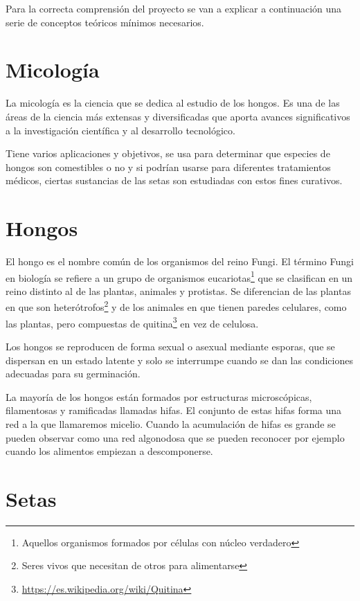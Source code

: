 
Para la correcta comprensión del proyecto se van a explicar a continuación una serie de conceptos teóricos mínimos necesarios.

\section{Micología}

La micología es la ciencia que se dedica al estudio de los hongos. Es una de las áreas de la ciencia más extensas y diversificadas que aporta avances significativos a la investigación científica y al desarrollo tecnológico. ~\cite{wiki:micologia}

Tiene varios aplicaciones y objetivos, se usa para determinar que especies de hongos son comestibles o no y si podrían usarse para diferentes tratamientos médicos, ciertas sustancias de las setas son estudiadas con estos fines curativos. \cite{micologiaDef}

\section{Hongos}

El hongo es el nombre común de los organismos del reino Fungi. El término Fungi en biología se refiere a un grupo de organismos eucariotas\footnote{Aquellos organismos formados por células con núcleo verdadero} que se clasifican en un reino distinto al de las plantas, animales y protistas. Se diferencian de las plantas en que son heterótrofos\footnote{Seres vivos que necesitan de otros para alimentarse} y de los animales en que tienen paredes celulares, como las plantas, pero compuestas de quitina\footnote{\url{https://es.wikipedia.org/wiki/Quitina}} en vez de celulosa.

Los hongos se reproducen de forma sexual o asexual mediante esporas, que se dispersan en un estado latente y solo se interrumpe cuando se dan las condiciones adecuadas para su germinación. ~\cite{wiki:fungi}

La mayoría de los hongos están formados por estructuras microscópicas, filamentosas y ramificadas llamadas hifas. El conjunto de estas hifas forma una red a la que llamaremos micelio. Cuando la acumulación de hifas es grande se pueden observar como una red algonodosa que se pueden reconocer por ejemplo cuando los alimentos empiezan a descomponerse. ~\cite{setas}

\section{Setas}

